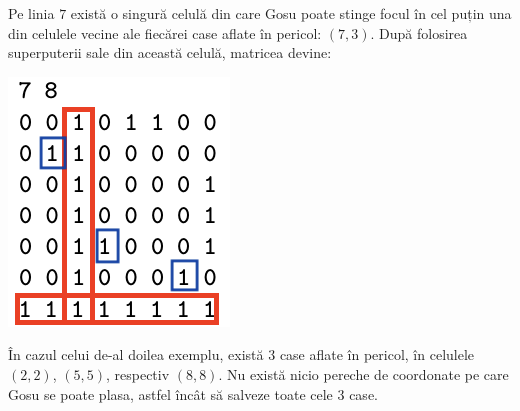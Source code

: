 \documentclass[ro]{problem}
\begin{document}
\par

Pe linia $7$ există o singură celulă din care Gosu poate stinge focul în cel puțin una din celulele vecine ale fiecărei case aflate în pericol: $(7, 3)$. După folosirea superputerii sale din această celulă, matricea devine:
\begin{center}
    \includegraphics{foc-exemplu.png}
\end{center}

\par

În cazul celui de-al doilea exemplu, există $3$ case aflate în pericol, în celulele $(2, 2)$, $(5, 5)$, respectiv $(8, 8)$. Nu există nicio pereche de coordonate pe care Gosu se poate plasa, astfel încât să salveze toate cele $3$ case.
\end{document}
